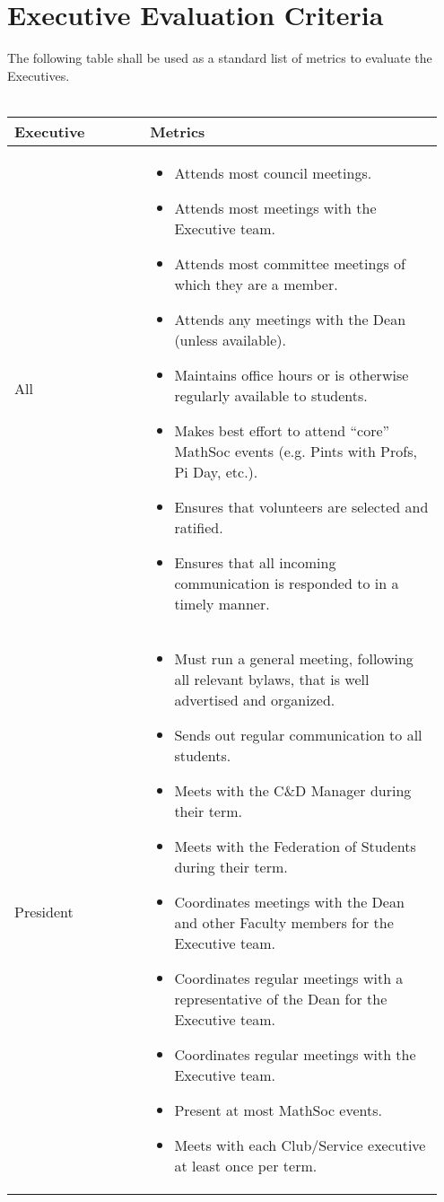 \section{Executive Evaluation Criteria}

The following table shall be used as a standard list of metrics to evaluate the Executives.\\
\\
\begin{longtable}{p{0.3\linewidth} p{0.65\linewidth}}
\toprule
Executive & Metrics\\
\midrule
All &
\begin{itemize}
\item Attends most council meetings.
\item Attends most meetings with the Executive team.
\item Attends most committee meetings of which they are a member.
\item Attends any meetings with the Dean (unless available).
\item Maintains office hours or is otherwise regularly available to students.
\item Makes best effort to attend “core” MathSoc events (e.g. Pints with Profs, Pi Day, etc.).
\item Ensures that volunteers are selected and ratified.
\item Ensures that all incoming communication is responded to in a timely manner.
\end{itemize}
\\
\midrule
President &
\begin{itemize}
\item Must run a general meeting, following all relevant bylaws, that is well advertised and organized.
\item Sends out regular communication to all students.
\item Meets with the C\&D Manager during their term.
\item Meets with the Federation of Students during their term.
\item Coordinates meetings with the Dean and other Faculty members for
the Executive team.
\item Coordinates regular meetings with a representative of the Dean for the
Executive team.
\item Coordinates regular meetings with the Executive team.
\item Present at most MathSoc events.
\item Meets with each Club/Service executive at least once per term.

\end{itemize}
\end{longtable}
